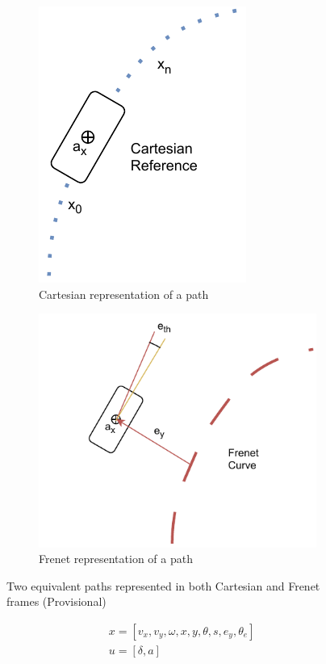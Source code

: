 \documentclass[a4paper,fleqn]{cas-sc}
\begin{document}
\begin{figure}
    \centering
        \begin{subfigure}{0.5\textwidth}
          \centering
          \includegraphics[width=.45\textwidth]{figs/Cartesian.drawio.pdf}
          \caption{Cartesian representation of a path}
        \end{subfigure}%
        \begin{subfigure}{.5\textwidth}
          \centering
          \includegraphics[width=.7\textwidth]{figs/Frenet.drawio.pdf}
          \caption{Frenet representation of a path}
        \end{subfigure}
    \caption{Two equivalent paths represented in both Cartesian and Frenet frames (Provisional) }
    \label{fig:FvC}
\end{figure}
\begin{equation}
    \label{eq:NL_model}
        \begin{aligned}
            &x = [v_x, v_y, \omega, x, y, \theta, s, e_y, \theta_e]\\ 
            &u = [\delta, a]
        \end{aligned}
\end{equation}
\end{document}
